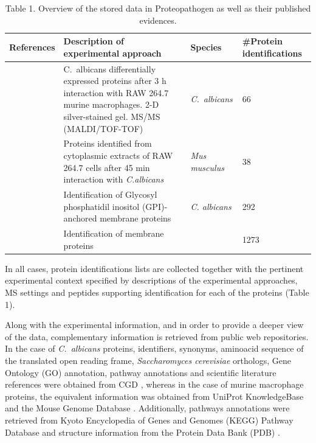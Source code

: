 \begin{table}[t]

\caption*{Table 1. Overview of the stored data in Proteopathogen as well as their published evidences.}

\renewcommand{\arraystretch}{2}
\footnotesize
\centering

\begin{tabular}{p{3cm} p{4cm} l p{2cm} }

\hline
References & Description of  \newline{} experimental approach & Species & \#Protein \newline{} identifications \\
\hline
\

\citep{Fernandez-Arenas2007} & \mbox{C. albicans} differentially expressed proteins after 3 h interaction with RAW 264.7 murine macrophages. 2-D silver-stained gel. MS/MS (MALDI/TOF-TOF) & \textit{\mbox{C. albicans}} & 66\\

\citep{Martinez-Solano2006a} & Proteins identified from cytoplasmic extracts of RAW 264.7 cells after 45 min interaction with \textit{C.albicans} & \textit{Mus musculus} & 38\\

\citep{Cabezon2009} & Identification of Glycosyl phosphatidil inositol (GPI)-anchored membrane proteins & \textit{C. albicans} & 292\\

 & Identification of membrane proteins &  & 1273\\

\end{tabular}
\end{table}



In all cases, protein identifications lists are collected
together with the pertinent experimental context specified
by descriptions of the experimental approaches, MS settings
and peptides supporting identification for each of the
proteins (Table 1).

Along with the experimental information, and in order to
provide a deeper view of the data, complementary information
 is retrieved from public web repositories. In the
case of \textit{\mbox{C. albicans}} proteins, identifiers, synonyms, aminoacid
sequence of the translated open reading frame, \textit{Saccharomyces
cerevisiae} orthologs, Gene Ontology (GO) annotation, pathway
annotations and scientific literature references were obtained
from CGD \citep{Arnaud2005}, whereas in the case of murine macrophage
proteins, the equivalent information was obtained from
UniProt KnowledgeBase \citep{Uniprot2008} and the Mouse Genome Database
 \citep{Bult2008}. Additionally, pathways annotations were retrieved
from Kyoto Encyclopedia of Genes and Genomes (KEGG)
Pathway Database \citep{Kanehisa2007} and structure information from the
Protein Data Bank (PDB) \citep{Berman2000}.

